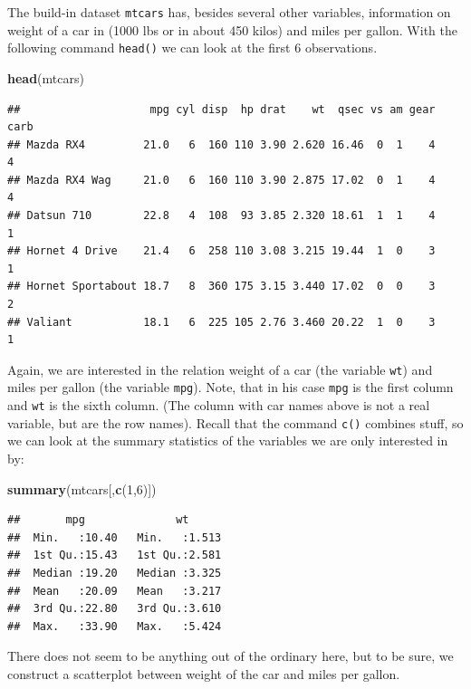 \documentclass[]{article}
\newenvironment{Shaded}{\begin{snugshade}}{\end{snugshade}}
\newcommand{\KeywordTok}[1]{\textcolor[rgb]{0.13,0.29,0.53}{\textbf{{#1}}}}
\newcommand{\DecValTok}[1]{\textcolor[rgb]{0.00,0.00,0.81}{{#1}}}
\newcommand{\NormalTok}[1]{{#1}}
\begin{document}
The build-in dataset \texttt{mtcars} has, besides several other
variables, information on weight of a car in (1000 lbs or in about 450
kilos) and miles per gallon. With the following command \texttt{head()}
we can look at the first 6 observations.

\begin{Shaded}
\begin{Highlighting}[]
\KeywordTok{head}\NormalTok{(mtcars)}
\end{Highlighting}
\end{Shaded}

\begin{verbatim}
##                    mpg cyl disp  hp drat    wt  qsec vs am gear carb
## Mazda RX4         21.0   6  160 110 3.90 2.620 16.46  0  1    4    4
## Mazda RX4 Wag     21.0   6  160 110 3.90 2.875 17.02  0  1    4    4
## Datsun 710        22.8   4  108  93 3.85 2.320 18.61  1  1    4    1
## Hornet 4 Drive    21.4   6  258 110 3.08 3.215 19.44  1  0    3    1
## Hornet Sportabout 18.7   8  360 175 3.15 3.440 17.02  0  0    3    2
## Valiant           18.1   6  225 105 2.76 3.460 20.22  1  0    3    1
\end{verbatim}

Again, we are interested in the relation weight of a car (the variable
\texttt{wt}) and miles per gallon (the variable \texttt{mpg}). Note,
that in his case \texttt{mpg} is the first column and \texttt{wt} is the
sixth column. (The column with car names above is not a real variable,
but are the row names). Recall that the command \texttt{c()} combines
stuff, so we can look at the summary statistics of the variables we are
only interested in by:

\begin{Shaded}
\begin{Highlighting}[]
\KeywordTok{summary}\NormalTok{(mtcars[,}\KeywordTok{c}\NormalTok{(}\DecValTok{1}\NormalTok{,}\DecValTok{6}\NormalTok{)])}
\end{Highlighting}
\end{Shaded}

\begin{verbatim}
##       mpg              wt       
##  Min.   :10.40   Min.   :1.513  
##  1st Qu.:15.43   1st Qu.:2.581  
##  Median :19.20   Median :3.325  
##  Mean   :20.09   Mean   :3.217  
##  3rd Qu.:22.80   3rd Qu.:3.610  
##  Max.   :33.90   Max.   :5.424
\end{verbatim}

There does not seem to be anything out of the ordinary here, but to be
sure, we construct a scatterplot between weight of the car and miles per
gallon.
\end{document}
